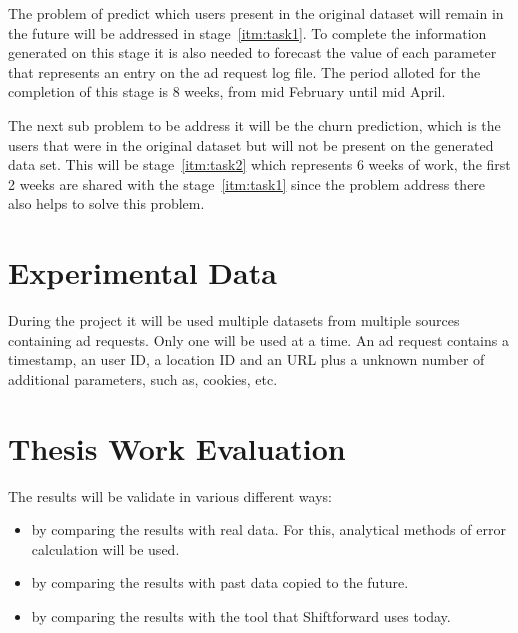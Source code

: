 The problem of predict which users present in the original dataset will remain
in the future will be addressed in stage~\ref{itm:task1}. To complete the
information generated on this stage it is also needed to forecast the value of
each parameter that represents an entry on the ad request log file. The period
alloted for the completion of this stage is 8 weeks, from mid February until mid
April.

The next sub problem to be address it will be the churn prediction, which is the
users that were in the original dataset but will not be present on the generated
data set. This will be stage~\ref{itm:task2} which represents 6 weeks of work,
the first 2 weeks are shared with the stage~\ref{itm:task1} since the problem
address there also helps to solve this problem.




\section{Experimental Data}

During the project it will be used multiple datasets from multiple sources containing ad requests. 
Only one will be used at a time. 
An ad request contains a timestamp, an user ID, a location ID and an URL plus a unknown number of
additional parameters, such as, cookies, etc.

\section{Thesis Work Evaluation}

The results will be validate in various different ways:
\begin{itemize}
    \item by comparing the results with real data. For this, analytical methods of error calculation will be used.
    \item by comparing the results with past data copied to the future.
    \item by comparing the results with the tool that Shiftforward uses today.
\end{itemize}
